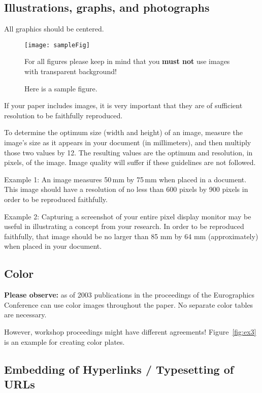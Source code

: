\subsection{Illustrations, graphs, and photographs}

All graphics should be centered.

\begin{figure}[htb]
  \centering
\texttt{[image: sampleFig]}
\parbox[t]{.9\columnwidth}{\relax
           For all figures please keep in mind that you \textbf{must not}
           use images with transparent background! 
           }
\caption{\label{fig:firstExample}
           Here is a sample figure.}
\end{figure}

If your paper includes images, it is very important that they are of
sufficient resolution to be faithfully reproduced.

To determine the optimum size (width and height) of an image, measure
the image's size as it appears in your document (in millimeters), and
then multiply those two values by 12. The resulting values are the
optimum  and  resolution, in pixels, of the image. Image quality
will suffer if these guidelines are not followed.

Example 1: 
An image measures 50\,mm by 75\,mm when placed in a document. This
image should have a resolution of no less than 600 pixels by 900
pixels in order to be reproduced faithfully.

Example 2: 
Capturing a screenshot of your entire  pixel display
monitor may be useful in illustrating a concept from your research. In
order to be reproduced faithfully, that  image should
be no larger than 85 mm by 64 mm (approximately) when placed in your
document.


\subsection{Color}

\textbf{Please observe:} as of 2003 publications in the proceedings of the
Eurographics Conference can use color images throughout the paper. No
separate color tables are necessary.

However, workshop proceedings might have different agreements! 
Figure~\ref{fig:ex3} is an example for creating color plates.

\subsection{Embedding of Hyperlinks / Typesetting of URLs}


